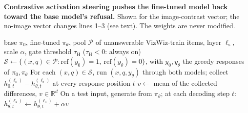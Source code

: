 \begin{algorithm}[t]
\caption{\textbf{Contrastive activation steering pushes the fine-tuned model back toward
the base model's refusal.} Shown for the image-contrast vector; the no-image vector
changes lines 1--3 (see text). The weights are never modified.}
\label{alg:steer}
\begin{algorithmic}[1]
\Require base $\pi_0$, fine-tuned $\pi_\theta$, pool $\mathcal{P}$ of unanswerable
  VizWiz-train items, layer $\ell_{\mathrm{s}}$, scale $\alpha$, gate threshold
  $\tau_{\mathrm{H}}$ ($\tau_{\mathrm{H}} < 0$: always on)
\State $\mathcal{S} \gets \{(x, q) \in \mathcal{P} : \mathrm{ref}(y_0) = 1,\
  \mathrm{ref}(y_\theta) = 0\}$, with $y_0, y_\theta$ the greedy responses of
  $\pi_0, \pi_\theta$
\State For each $(x, q) \in \mathcal{S}$, run $(x, q, y_\theta)$ through both models; collect
  $h^{(\ell_{\mathrm{s}})}_{0,t} - h^{(\ell_{\mathrm{s}})}_{\theta,t}$ at every response
  position $t$
\State $v \gets$ mean of the collected differences, $v \in \mathbb{R}^{d}$
\State On a test input, generate from $\pi_\theta$; at each decoding step $t$:
\If{$\tau_{\mathrm{H}} < 0$ \textbf{or} $H_{t-1} > \tau_{\mathrm{H}}$}
  \State $h^{(\ell_{\mathrm{s}})}_{\theta,t} \gets h^{(\ell_{\mathrm{s}})}_{\theta,t} + \alpha v$
\EndIf
\end{algorithmic}
\end{algorithm}

